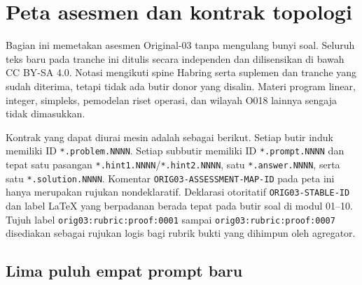
\section{Peta asesmen dan kontrak topologi}
\label{orig03:section:peta-asesmen}

Bagian ini memetakan asesmen Original-03 tanpa mengulang bunyi soal. Seluruh
teks baru pada tranche ini ditulis secara independen dan dilisensikan di bawah
CC BY-SA 4.0. Notasi mengikuti spine Habring serta suplemen dan tranche yang
sudah diterima, tetapi tidak ada butir donor yang disalin. Materi program linear,
integer, simpleks, pemodelan riset operasi, dan wilayah O018 lainnya sengaja
tidak dimasukkan.

Kontrak yang dapat diurai mesin adalah sebagai berikut. Setiap butir induk
memiliki ID \texttt{*.problem.NNNN}. Setiap subbutir memiliki ID
\texttt{*.prompt.NNNN} dan tepat satu pasangan
\texttt{*.hint1.NNNN}/\texttt{*.hint2.NNNN}, satu
\texttt{*.answer.NNNN}, serta satu \texttt{*.solution.NNNN}. Komentar
\texttt{ORIG03-ASSESSMENT-MAP-ID} pada peta ini hanya merupakan rujukan
nondeklaratif. Deklarasi otoritatif \texttt{ORIG03-STABLE-ID} dan label LaTeX
yang berpadanan berada tepat pada butir soal di modul 01--10. Tujuh label
\texttt{orig03:rubric:proof:0001} sampai
\texttt{orig03:rubric:proof:0007} disediakan sebagai rujukan logis bagi rubrik
bukti yang dihimpun oleh agregator.

\subsection{Lima puluh empat prompt baru}

